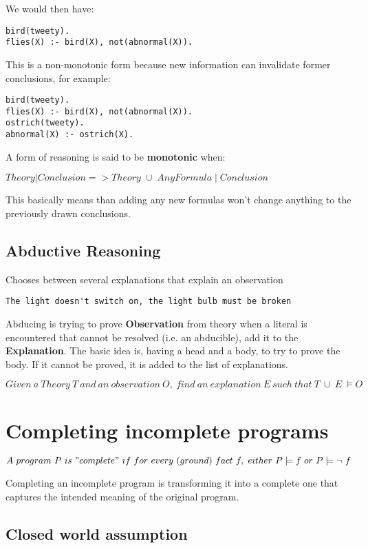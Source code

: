 \documentclass[12pt, oneside]{report}
\numberwithin{definition}{chapter}
\numberwithin{theorem}{chapter}
\numberwithin{lemma}{chapter}
\numberwithin{Rule}{chapter}
\numberwithin{equation}{chapter}
\begin{document}
We would then have:
\begin{verbatim}
bird(tweety).
flies(X) :- bird(X), not(abnormal(X)).
\end{verbatim}
This is a non-monotonic form because new information can invalidate former conclusions, for example:

\begin{verbatim}
bird(tweety).
flies(X) :- bird(X), not(abnormal(X)).
ostrich(tweety).
abnormal(X) :- ostrich(X).
\end{verbatim}

A form of reasoning is said to be \textbf{monotonic} when:

\begin{tcolorbox}
$
Theory | Conclusion  => Theory\;\cup\;{AnyFormula}\; |\; Conclusion
$
\end{tcolorbox}
This basically means than adding any new formulas won't change anything to the previously drawn conclusions.
\subsection{Abductive Reasoning}
Chooses between several explanations that explain an observation
\begin{verbatim}
The light doesn't switch on, the light bulb must be broken
\end{verbatim}
Abducing is trying to prove \textbf{Observation} from theory when a literal is encountered that cannot be resolved (i.e. an abducible), add it to the \textbf{Explanation}. The basic idea is, having a head and a body, to try to prove the body. If it cannot be proved, it is added to the list of explanations. 
\begin{tcolorbox}
$
Given\ a\ Theory\ T\ and\ an\ observation\ O,\ find\ an\ explanation\ E\ such\ that\ T \ \cup \ E\ \models O
$
\end{tcolorbox}
\section{Completing incomplete programs}
\begin{tcolorbox}
$
A\ program\ P\ is\ "complete"\ if\ for\ every\ (ground)\ fact\ f ,\ either\ P\models f\ or\ P\models \neg\ f
$
\end{tcolorbox}
Completing an incomplete program is transforming it into a complete one that captures the intended meaning of the original program.
\subsection{Closed world assumption}
\end{document}
